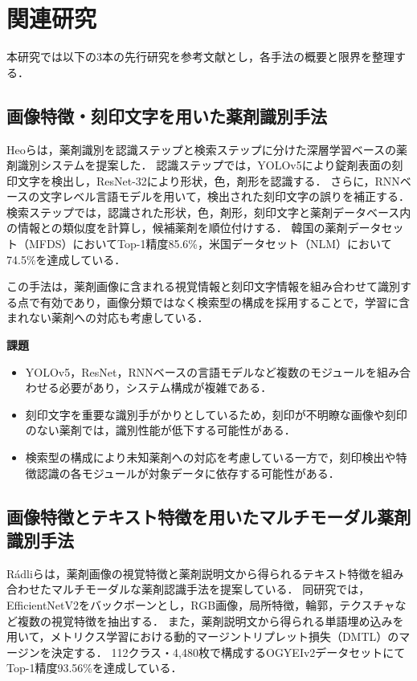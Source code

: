 \documentclass{ltjsarticle}
\begin{document}
\section{関連研究}\label{sec2}

本研究では以下の3本の先行研究を参考文献とし，各手法の概要と限界を整理する．

\subsection{画像特徴・刻印文字を用いた薬剤識別手法}

Heoら\cite{heo2023pill}は，薬剤識別を認識ステップと検索ステップに分けた深層学習ベースの薬剤識別システムを提案した．
認識ステップでは，YOLOv5により錠剤表面の刻印文字を検出し，ResNet-32により形状，色，剤形を認識する．
さらに，RNNベースの文字レベル言語モデルを用いて，検出された刻印文字の誤りを補正する．
検索ステップでは，認識された形状，色，剤形，刻印文字と薬剤データベース内の情報との類似度を計算し，候補薬剤を順位付けする．
韓国の薬剤データセット（MFDS）においてTop-1精度85.6\%，米国データセット（NLM）において74.5\%を達成している．

この手法は，薬剤画像に含まれる視覚情報と刻印文字情報を組み合わせて識別する点で有効であり，画像分類ではなく検索型の構成を採用することで，学習に含まれない薬剤への対応も考慮している．

\textbf{課題}
\begin{itemize}
  \item YOLOv5，ResNet，RNNベースの言語モデルなど複数のモジュールを組み合わせる必要があり，システム構成が複雑である．
  \item 刻印文字を重要な識別手がかりとしているため，刻印が不明瞭な画像や刻印のない薬剤では，識別性能が低下する可能性がある．
  \item 検索型の構成により未知薬剤への対応を考慮している一方で，刻印検出や特徴認識の各モジュールが対象データに依存する可能性がある．
\end{itemize}

\subsection{画像特徴とテキスト特徴を用いたマルチモーダル薬剤識別手法}

Rádliら\cite{radli2024metric}は，薬剤画像の視覚特徴と薬剤説明文から得られるテキスト特徴を組み合わせたマルチモーダルな薬剤認識手法を提案している．
同研究では，EfficientNetV2をバックボーンとし，RGB画像，局所特徴，輪郭，テクスチャなど複数の視覚特徴を抽出する．
また，薬剤説明文から得られる単語埋め込みを用いて，メトリクス学習における動的マージントリプレット損失（DMTL）のマージンを決定する．
112クラス・4,480枚で構成するOGYEIv2データセットにてTop-1精度93.56\%を達成している．
\end{document}

